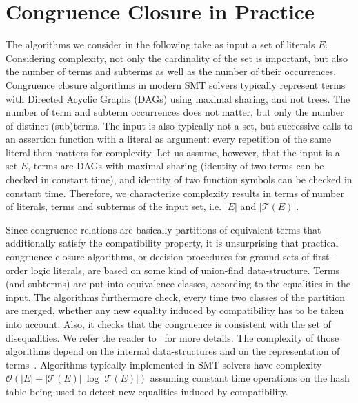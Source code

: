 \documentclass[smallextended]{svjour3}
\begin{document}
\section{Congruence Closure in Practice}

The algorithms we consider in the following take as input a set of literals $E$.
Considering complexity, not only the cardinality of the set is important, but
also the number of terms and subterms as well as the number of their
occurrences.  Congruence closure algorithms in modern SMT solvers typically
represent terms with Directed Acyclic Graphs (DAGs) using maximal sharing, and
not trees.  The number of term and subterm occurrences does not matter, but only
the number of distinct (sub)terms.  The input is also typically not a set, but
successive calls to an assertion function with a literal as argument: every
repetition of the same literal then matters for complexity.  Let us assume,
however, that the input is a set $E$, terms are DAGs with maximal
sharing (identity of two terms can be checked in constant time), and
identity of two function symbols can be checked in constant time.  Therefore, we
characterize complexity results in terms of number of literals, terms and
subterms of the input set, i.e. $|E|$ and $|\mathcal{T}(E)|$.

Since congruence relations are basically partitions of equivalent terms that
additionally satisfy the compatibility property, it is unsurprising that
practical congruence closure algorithms, or decision procedures for ground sets
of first-order logic literals, are based on some kind of union-find
data-structure.  Terms (and subterms) are put into equivalence classes,
according to the equalities in the input.  The algorithms furthermore check,
every time two classes of the partition are merged, whether any new equality induced
by compatibility has to be taken into account.  Also, it checks that the
congruence is consistent with the set of disequalities.  We refer the reader
to~\cite{Nelson2,Downey1,Nieuwenhuis6} for more details.  The complexity of
those algorithms depend on the internal data-structures and on the
representation of terms~\cite{Downey1}.  Algorithms typically implemented in SMT
solvers have complexity $\mathcal{O}(|E| + |\mathcal{T}(E)|\ \log
|\mathcal{T}(E)|)$ assuming constant time operations on the hash table being used to detect new equalities induced by compatibility.
\end{document}
